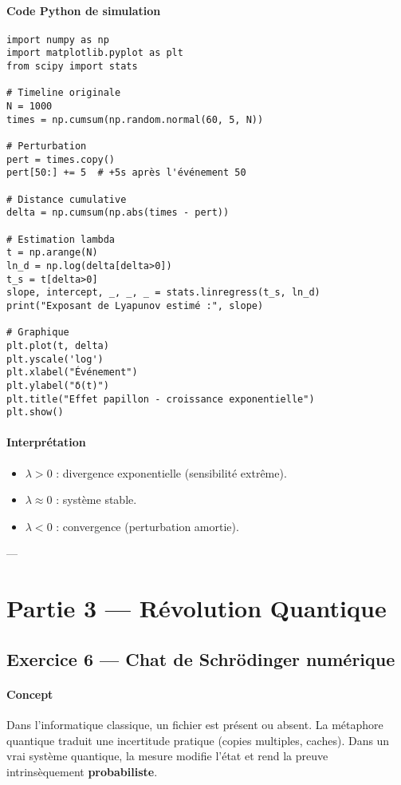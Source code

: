 \documentclass[11pt]{article}
\begin{document}
\paragraph{Code Python de simulation}
\begin{lstlisting}
import numpy as np
import matplotlib.pyplot as plt
from scipy import stats

# Timeline originale
N = 1000
times = np.cumsum(np.random.normal(60, 5, N))

# Perturbation
pert = times.copy()
pert[50:] += 5  # +5s après l'événement 50

# Distance cumulative
delta = np.cumsum(np.abs(times - pert))

# Estimation lambda
t = np.arange(N)
ln_d = np.log(delta[delta>0])
t_s = t[delta>0]
slope, intercept, _, _, _ = stats.linregress(t_s, ln_d)
print("Exposant de Lyapunov estimé :", slope)

# Graphique
plt.plot(t, delta)
plt.yscale('log')
plt.xlabel("Événement")
plt.ylabel("δ(t)")
plt.title("Effet papillon - croissance exponentielle")
plt.show()
\end{lstlisting}

\paragraph{Interprétation}
\begin{itemize}
  \item $\lambda > 0$ : divergence exponentielle (sensibilité extrême).
  \item $\lambda \approx 0$ : système stable.
  \item $\lambda < 0$ : convergence (perturbation amortie).
\end{itemize}

---

\section{Partie 3 — Révolution Quantique}

\subsection{Exercice 6 — Chat de Schrödinger numérique}

\paragraph{Concept}
Dans l’informatique classique, un fichier est présent ou absent.  
La métaphore quantique traduit une incertitude pratique (copies multiples, caches).  
Dans un vrai système quantique, la mesure modifie l’état et rend la preuve intrinsèquement \textbf{probabiliste}.
\end{document}
